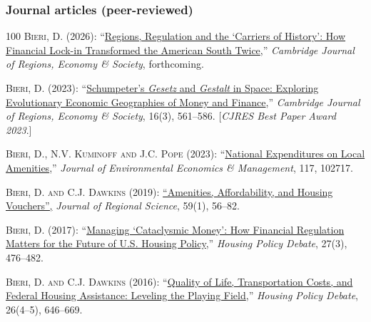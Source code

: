 \documentclass[letter,11pt]{article}
\begin{document}
\subsubsection*{Journal articles (peer-reviewed)}
\begingroup
\renewcommand{\section}[2]{}
\begin{thebibliography}{100}
\textsc{Bieri, D.} (2026): \enquote{\href{https://academic.oup.com/cjres/advance-article-abstract/doi/10.1093/cjres/rsaf052/8440189?}{Regions, Regulation and the \enquote{Carriers of History}: How Financial Lock-in Transformed the American South Twice},} \emph{Cambridge Journal of Regions, Economy \& Society}, forthcoming.

\textsc{Bieri, D.} (2023): \enquote{\href{https://academic.oup.com/cjres/article/16/3/561/7258686?}{Schumpeter’s \emph{Gesetz} and \emph{Gestalt} in Space: Exploring Evolutionary Economic Geographies of Money and Finance},} \emph{Cambridge Journal of Regions, Economy \& Society}, 16(3), 561--586. [\emph{CJRES Best Paper Award 2023}.]

\textsc{Bieri, D., N.V. Kuminoff {\small and} J.C. Pope} (2023): \enquote{\href{https://www.sciencedirect.com/science/article/pii/S0095069622000766}{National Expenditures on Local Amenities},} \emph{Journal of Environmental Economics \& Management}, 117, 102717.

\textsc{Bieri, D.  {\small and} C.J. Dawkins} (2019):  \href{https://onlinelibrary.wiley.com/doi/abs/10.1111/jors.12400}{\enquote{Amenities, Affordability, and Housing Vouchers},} \emph{Journal of Regional Science}, 59(1), 56--82. %

\textsc{Bieri, D.} (2017): \enquote{\href{http://www.tandfonline.com/doi/full/10.1080/10511482.2017.1298211}{Managing `Cataclysmic Money': How Financial Regulation Matters for the Future of U.S. Housing Policy},} \emph{Housing Policy Debate}, 27(3), 476--482.

\textsc{Bieri, D.  {\small and} C.J. Dawkins} (2016):  \enquote{\href{http://www.tandfonline.com/doi/full/10.1080/10511482.2016.1188844}{Quality of Life, Transportation Costs, and Federal Housing Assistance: Leveling the Playing Field},} \emph{Housing Policy Debate}, 26(4--5), 646--669.


\end{thebibliography}
\end{document}
